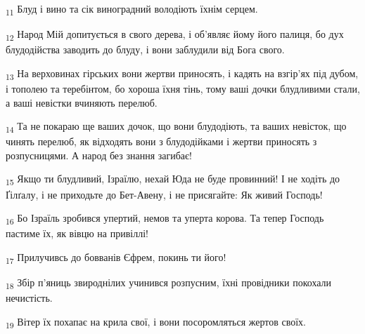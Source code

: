 \begin{tcolorbox}
\textsubscript{11} Блуд і вино та сік виноградний володіють їхнім серцем.
\end{tcolorbox}
\begin{tcolorbox}
\textsubscript{12} Народ Мій допитується в свого дерева, і об'являє йому його палиця, бо дух блудодійства заводить до блуду, і вони заблудили від Бога свого.
\end{tcolorbox}
\begin{tcolorbox}
\textsubscript{13} На верховинах гірських вони жертви приносять, і кадять на взгір'ях під дубом, і тополею та теребінтом, бо хороша їхня тінь, тому ваші дочки блудливими стали, а ваші невістки вчиняють перелюб.
\end{tcolorbox}
\begin{tcolorbox}
\textsubscript{14} Та не покараю ще ваших дочок, що вони блудодіють, та ваших невісток, що чинять перелюб, як відходять вони з блудодійками і жертви приносять з розпусницями. А народ без знання загибає!
\end{tcolorbox}
\begin{tcolorbox}
\textsubscript{15} Якщо ти блудливий, Ізраїлю, нехай Юда не буде провинний! І не ходіть до Ґілґалу, і не приходьте до Бет-Авену, і не присягайте: Як живий Господь!
\end{tcolorbox}
\begin{tcolorbox}
\textsubscript{16} Бо Ізраїль зробився упертий, немов та уперта корова. Та тепер Господь пастиме їх, як вівцю на привіллі!
\end{tcolorbox}
\begin{tcolorbox}
\textsubscript{17} Прилучивсь до бовванів Єфрем, покинь ти його!
\end{tcolorbox}
\begin{tcolorbox}
\textsubscript{18} Збір п'яниць звироднілих учинився розпусним, їхні провідники покохали нечистість.
\end{tcolorbox}
\begin{tcolorbox}
\textsubscript{19} Вітер їх похапає на крила свої, і вони посоромляться жертов своїх.
\end{tcolorbox}
